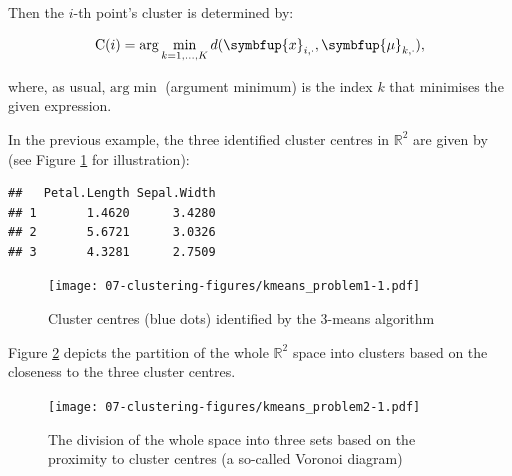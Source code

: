 \documentclass[10pt,b5paper,krantz1]{krantz}
\newenvironment{Shaded}{\begin{snugshade}}{\end{snugshade}}
\newcommand{\CommentTok}[1]{\textcolor[rgb]{0.37,0.37,0.37}{\textit{#1}}}
\newcommand{\DataTypeTok}[1]{\textcolor[rgb]{0.27,0.27,0.27}{#1}}
\newcommand{\DecValTok}[1]{\textcolor[rgb]{0.06,0.06,0.06}{#1}}
\newcommand{\KeywordTok}[1]{\textcolor[rgb]{0.27,0.27,0.27}{\textbf{#1}}}
\newcommand{\NormalTok}[1]{#1}
\newcommand{\OperatorTok}[1]{\textcolor[rgb]{0.43,0.43,0.43}{\textbf{#1}}}
\renewcommand{\mathbf}[1]{\symbfup{#1}}
\renewcommand{\boldsymbol}[1]{\symbfup{#1}}
\begin{document}
Then the \(i\)-th point's cluster is determined by:

\[
\mathrm{C}(i) = \mathrm{arg}\min_{k=1,\dots,K}
d(\mathbf{x}_{i,\cdot}, \boldsymbol\mu_{k,\cdot}),
\]

where, as usual, \(\mathrm{arg}\min\) (argument minimum) is the index
\(k\) that minimises the given expression.

In the previous example, the three identified cluster centres in \(\mathbb{R}^2\)
are given by (see Figure \ref{fig:kmeans_problem1} for illustration):

\begin{Shaded}
\end{Shaded}

\begin{verbatim}
##   Petal.Length Sepal.Width
## 1       1.4620      3.4280
## 2       5.6721      3.0326
## 3       4.3281      2.7509
\end{verbatim}

\begin{Shaded}
\end{Shaded}

\begin{figure}
\hypertarget{fig:kmeans_problem1}{%
\centering
\texttt{[image: 07-clustering-figures/kmeans\_problem1-1.pdf]}
\caption{Cluster centres (blue dots) identified by the 3-means algorithm}\label{fig:kmeans_problem1}
}
\end{figure}

Figure \ref{fig:kmeans_problem2} depicts the partition
of the whole \(\mathbb{R}^2\) space
into clusters based on the closeness to the three cluster centres.

\begin{figure}
\hypertarget{fig:kmeans_problem2}{%
\centering
\texttt{[image: 07-clustering-figures/kmeans\_problem2-1.pdf]}
\caption{The division of the whole space into three sets based on the proximity to cluster centres (a so-called Voronoi diagram)}\label{fig:kmeans_problem2}
}
\end{figure}
\end{document}
